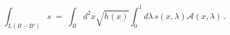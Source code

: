 \begin{equation}
\int_{L(B-B')} s \; = \; \int_B d^{2}x \sqrt{h(x)} \int_0^1 d\lambda\,
s(x, \lambda) \mathcal{A}(x, \lambda)\, .
\label{fmweq}
\end{equation}

